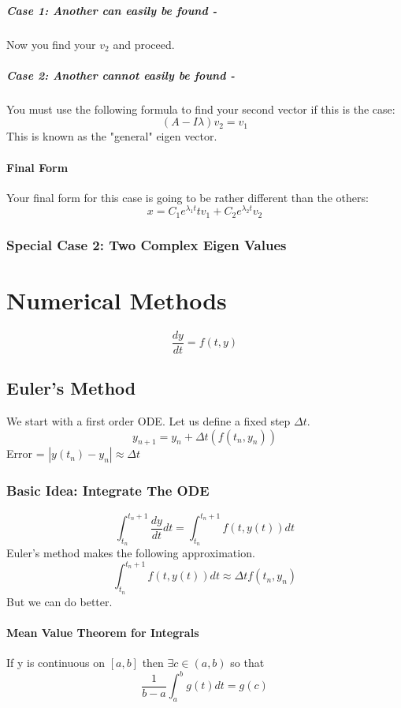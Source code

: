 \documentclass[a4paper,12pt]{report}
\begin{document}
\paragraph{Case 1: Another can easily be found - } Now you find your $v_2$ and proceed.

\paragraph{Case 2: Another cannot easily be found - } You must use the following formula 
to find your second vector if this is the case:
$$(A-I\lambda)v_2 = v_1$$
This is known as the "general" eigen vector.

\subsubsection{Final Form}
Your final form for this case is going to be rather different than the others:
$$x = C_1e^{\lambda_1 t}tv_1 + C_2e^{\lambda_2 t}v_2$$

\subsection{Special Case 2: Two Complex Eigen Values}

\chapter{Numerical Methods}
$$\frac{dy}{dt} = f(t, y)$$
\section{Euler's Method}
We start with a first order ODE. Let us define a fixed step $\Delta t$.
$$y_{n+1} = y_n + \Delta t(f(t_n, y_n))$$
Error = $|y(t_n)-y_n| \approx \Delta t$

\subsection{Basic Idea: Integrate The ODE}
$$\int_{t_n}^{t_n+1} \frac{dy}{dt} dt = \int_{t_n}^{t_n+1} f(t, y(t)) dt$$
Euler's method makes the following approximation.
$$\int_{t_n}^{t_n+1} f(t, y(t)) dt \approx \Delta t f(t_n, y_n)$$
But we can do better.

\subsubsection{Mean Value Theorem for Integrals}
If y is continuous on $[a, b]$ then $\exists c \in (a, b)$ so that 
$$\frac{1}{b-a} \int_a^b g(t) dt = g(c)$$
 
\end{document}
